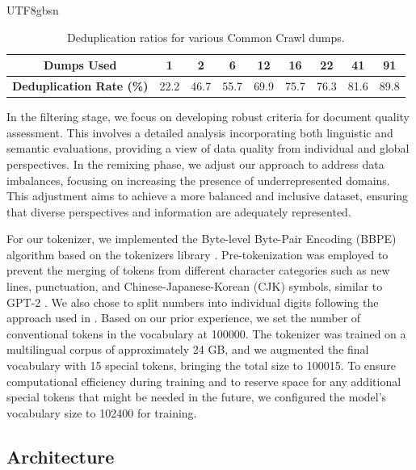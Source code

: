 \documentclass[11pt, a4paper, logo, copyright, nonumbering]{deepseek}
\begin{document}
\begin{CJK*}{UTF8}{gbsn}
\begin{table}[hb]
\centering
\begin{tabular}{c|cccccccc}
\toprule
\textbf{Dumps Used} & 1 & 2 & 6 & 12 & 16 & 22 & 41 & 91 \\
\midrule
\textbf{Deduplication Rate (\%)} & 22.2 & 46.7 & 55.7 & 69.9 & 75.7 & 76.3 & 81.6 & 89.8 \\
\bottomrule
\end{tabular}
\caption{\centering Deduplication ratios for various Common Crawl dumps.}
\label{tab:deduplication_ratios}
\end{table}

In the filtering stage, we focus on developing robust criteria for document quality assessment. This involves a detailed analysis incorporating both linguistic and semantic evaluations, providing a view of data quality from individual and global perspectives. In the remixing phase, we adjust our approach to address data imbalances, focusing on increasing the presence of underrepresented domains. This adjustment aims to achieve a more balanced and inclusive dataset, ensuring that diverse perspectives and information are adequately represented.

For our tokenizer, we implemented the Byte-level Byte-Pair Encoding (BBPE) algorithm based on the tokenizers library \citep{hftokenizers}. Pre-tokenization was employed to prevent the merging of tokens from different character categories such as new lines, punctuation, and Chinese-Japanese-Korean (CJK) symbols, similar to GPT-2 \citep{gpt2}.
We also chose to split numbers into individual digits following the approach used in \citep{llama, llama2}. Based on our prior experience, we set the number of conventional tokens in the vocabulary at 100000. The tokenizer was trained on a multilingual corpus of approximately 24 GB, and we augmented the final vocabulary with 15 special tokens, bringing the total size to 100015. To ensure computational efficiency during training and to reserve space for any additional special tokens that might be needed in the future, we configured the model's vocabulary size to 102400 for training.

\subsection{Architecture}


\end{CJK*}
\end{document}
